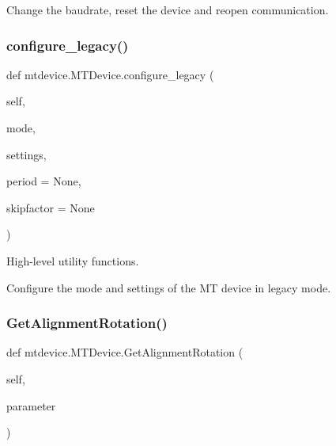 \begin{DoxyVerb}Change the baudrate, reset the device and reopen communication.\end{DoxyVerb}
 \mbox{\label{classmtdevice_1_1MTDevice_a487b8703cde676cd0877e0b07a40ed0c}} 
\subsubsection{\texorpdfstring{configure\+\_\+legacy()}{configure\_legacy()}}
{\footnotesize\ttfamily def mtdevice.\+M\+T\+Device.\+configure\+\_\+legacy (\begin{DoxyParamCaption}\item[{}]{self,  }\item[{}]{mode,  }\item[{}]{settings,  }\item[{}]{period = {\ttfamily None},  }\item[{}]{skipfactor = {\ttfamily None} }\end{DoxyParamCaption})}



High-\/level utility functions. 

\begin{DoxyVerb}Configure the mode and settings of the MT device in legacy mode.\end{DoxyVerb}
 \mbox{\label{classmtdevice_1_1MTDevice_a4473bb21765c708b18803fc26d8cc4d2}} 
\subsubsection{\texorpdfstring{Get\+Alignment\+Rotation()}{GetAlignmentRotation()}}
{\footnotesize\ttfamily def mtdevice.\+M\+T\+Device.\+Get\+Alignment\+Rotation (\begin{DoxyParamCaption}\item[{}]{self,  }\item[{}]{parameter }\end{DoxyParamCaption})}


